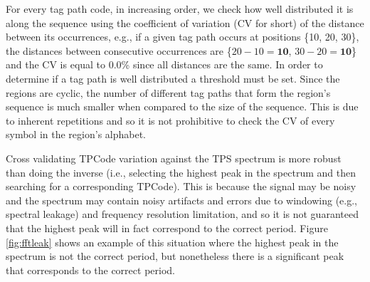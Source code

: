 \documentclass{vldb}
\begin{document}
For every tag path code, in increasing order, we check how well distributed it
is along the sequence using the coefficient of variation (CV for short) of the
distance between its occurrences, e.g., if a given tag path occurs at positions
\{10, 20, 30\}, the distances between consecutive occurrences are \{$20-10 =
\textbf{10}$, $30-20 = \textbf{10}$\} and the CV is equal to 0.0\% since all
distances are the same. In order to determine if a tag path is well distributed
a threshold must be set. Since the regions are cyclic, the number of different
tag paths that form the region's sequence is much smaller when compared to the
size of the sequence. This is due to inherent repetitions and so it is not
prohibitive to check the CV of every symbol in the region's alphabet.

Cross validating TPCode variation against the TPS spectrum is more robust than
doing the inverse (i.e., selecting the highest peak in the spectrum and then
searching for a corresponding TPCode). This is because the signal may be noisy
and the spectrum may contain noisy artifacts and errors due to windowing (e.g.,
spectral leakage) and frequency resolution limitation, and so it is not
guaranteed that the highest peak will in fact correspond to the correct
period.
Figure \ref{fig:fftleak} shows an example of this situation where the highest
peak in the spectrum is not the correct period, but nonetheless there is a
significant peak that corresponds to the correct period.
\end{document}
